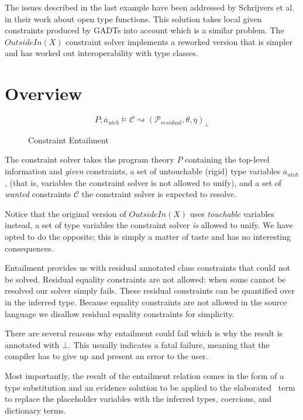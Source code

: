 The issues described in the last example have been addressed by Schrijvers et
al.~\cite{type-checking-with-open-type-functions} in their work about open type
functions. This solution takes local given constraints produced by GADTs into
account which is a similar problem. The $OutsideIn(X)$ constraint solver
implements a reworked version that is simpler and has worked out
interoperability with type classes.

\section{Overview}

\begin{figure}
\[ %
P ; \overline{a}_{utch} \vDash \mathcal{C} \rightsquigarrow
(\mathcal{P}_{residual}, \theta, \eta)_\bot
\]
\caption{Constraint Entailment}
\end{figure}

The constraint solver takes the program theory $P$ containing the top-level
information and \textit{given} constraints, a set of untouchable (rigid) type variables
$\overline{a}_{utch}$, (that is, variables the constraint solver is not allowed
to unify), and a set of \textit{wanted} constraints $\mathcal{C}$ the constraint solver is expected to resolve.

Notice that the original version of $OutsideIn(X)$ uses \textit{touchable} variables instead, a set of
type variables the constraint solver \textit{is} allowed to unify. We have opted to do
the opposite; this is simply a matter of taste and has no interesting
consequences.

Entailment provides us with residual annotated class constraints that could not
be solved. Residual equality constraints are not allowed: when some cannot be
resolved our solver simply fails. These residual constraints can be quantified over
in the inferred type. Because equality constraints are not allowed in the
source language we disallow residual equality constraints for simplicity.

There are several reasons why entailment could fail which is why the result is
annotated with $\bot$. This usually indicates a fatal failure, meaning that the
compiler has to give up and present an error to the user.

Most importantly, the result of the entailment relation comes in the form of a
type substitution and an evidence solution to be applied to the elaborated
\systemfc ~term to replace the placeholder variables with the inferred types,
coercions, and dictionary terms.

